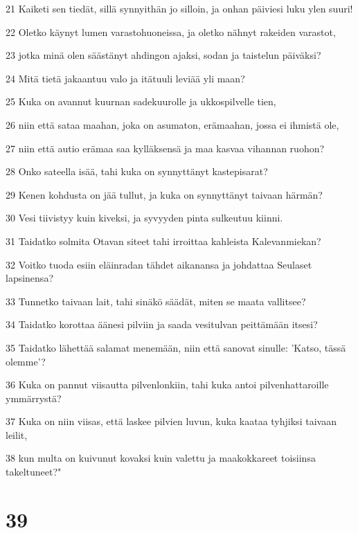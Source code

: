 \par 21 Kaiketi sen tiedät, sillä synnyithän jo silloin, ja onhan päiviesi luku ylen suuri!
\par 22 Oletko käynyt lumen varastohuoneissa, ja oletko nähnyt rakeiden varastot,
\par 23 jotka minä olen säästänyt ahdingon ajaksi, sodan ja taistelun päiväksi?
\par 24 Mitä tietä jakaantuu valo ja itätuuli leviää yli maan?
\par 25 Kuka on avannut kuurnan sadekuurolle ja ukkospilvelle tien,
\par 26 niin että sataa maahan, joka on asumaton, erämaahan, jossa ei ihmistä ole,
\par 27 niin että autio erämaa saa kylläksensä ja maa kasvaa vihannan ruohon?
\par 28 Onko sateella isää, tahi kuka on synnyttänyt kastepisarat?
\par 29 Kenen kohdusta on jää tullut, ja kuka on synnyttänyt taivaan härmän?
\par 30 Vesi tiivistyy kuin kiveksi, ja syvyyden pinta sulkeutuu kiinni.
\par 31 Taidatko solmita Otavan siteet tahi irroittaa kahleista Kalevanmiekan?
\par 32 Voitko tuoda esiin eläinradan tähdet aikanansa ja johdattaa Seulaset lapsinensa?
\par 33 Tunnetko taivaan lait, tahi sinäkö säädät, miten se maata vallitsee?
\par 34 Taidatko korottaa äänesi pilviin ja saada vesitulvan peittämään itsesi?
\par 35 Taidatko lähettää salamat menemään, niin että sanovat sinulle: 'Katso, tässä olemme'?
\par 36 Kuka on pannut viisautta pilvenlonkiin, tahi kuka antoi pilvenhattaroille ymmärrystä?
\par 37 Kuka on niin viisas, että laskee pilvien luvun, kuka kaataa tyhjiksi taivaan leilit,
\par 38 kun multa on kuivunut kovaksi kuin valettu ja maakokkareet toisiinsa takeltuneet?"

\chapter{39}

